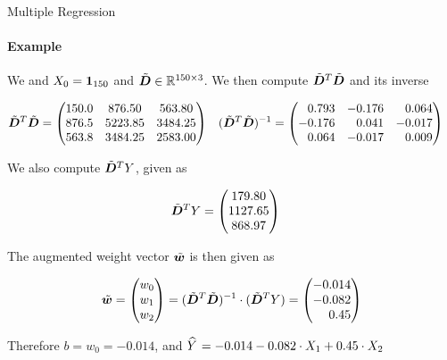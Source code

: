 \begin{frame}{Multiple Regression}
\framesubtitle{Example}
We and $X_0 = \mathbf{1}_{150}$ and 
$\tilde{{\boldsymbol D}} \in
{\mathord{\mathbb R}}^{150\times 3}$.
We then compute 
$\tilde{{\boldsymbol D}}^T\tilde{{\boldsymbol D}}$ and its inverse
\begin{small}
\begin{align*}
    \abD^T\abD & = \matr{
150.0 & 876.50  & 563.80\\
876.5 & 5223.85 & 3484.25\\
563.8 & 3484.25 & 2583.00 }
&
(\abD^T\abD)^{-1} & = \amatr{r}{
0.793 & -0.176 & 0.064\\
-0.176 &  0.041 & -0.017\\
0.064 & -0.017 &  0.009}
\end{align*}
\end{small}
We also compute $\tilde{{\boldsymbol D}}^T Y$, given as
\begin{small}
\begin{align*}
    \tilde{{\boldsymbol D}}^TY & = \begin{pmatrix} 
 179.80\\
 1127.65\\
 868.97 \end{pmatrix}
\end{align*}
\end{small}
The augmented weight vector $\tilde{{\boldsymbol w}}$ is then given as
\begin{small}
\begin{align*}
    \abw = \matr{w_0\\w_1\\w_2} = (\abD^T\abD)^{-1} \cdot (\abD^T Y) = 
    \amatr{r}{-0.014\\ -0.082\\ 0.45}
\end{align*}
\end{small}
Therefore $b=w_0=-0.014$, and
$\mkern 1.5mu\widehat{\mkern-1.5muY}\mkern 1.5mu = -0.014 -0.082 \cdot X_1 + 0.45\cdot X_2$

\end{frame}

